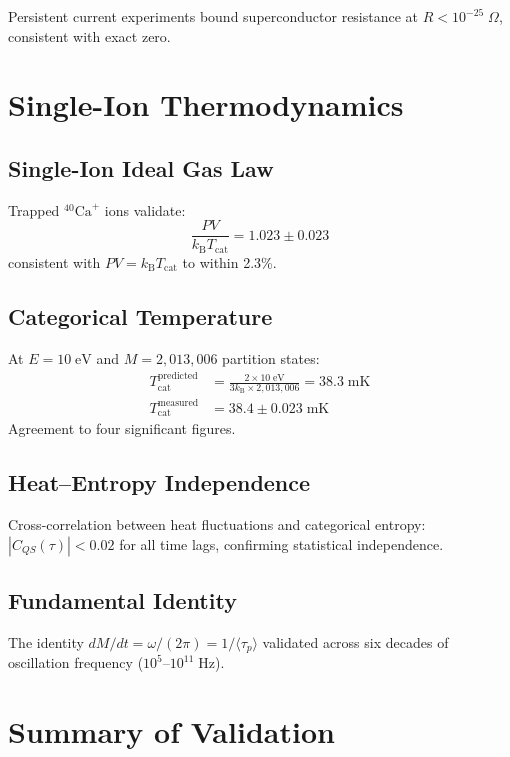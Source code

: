 \documentclass[twocolumn,10pt,a4paper]{article}
\theoremstyle{plain}
\theoremstyle{definition}
\theoremstyle{remark}
\newcommand{\kB}{k_{\mathrm{B}}}
\newcommand{\taup}{\tau_p}
\begin{document}
Persistent current experiments bound superconductor resistance at $R < 10^{-25}\;\Omega$, consistent with exact zero.

\section{Single-Ion Thermodynamics}
\label{sec:val_single}

\subsection{Single-Ion Ideal Gas Law}

Trapped $^{40}\mathrm{Ca}^+$ ions validate:
\begin{equation}
    \frac{PV}{\kB T_{\mathrm{cat}}} = 1.023 \pm 0.023
\end{equation}
consistent with $PV = \kB T_{\mathrm{cat}}$ to within 2.3\%.

\subsection{Categorical Temperature}

At $E = 10\;\mathrm{eV}$ and $M = 2{,}013{,}006$ partition states:
\begin{align}
    T_{\mathrm{cat}}^{\mathrm{predicted}} &= \frac{2 \times 10\;\mathrm{eV}}{3\kB \times 2{,}013{,}006} = 38.3\;\mathrm{mK} \\
    T_{\mathrm{cat}}^{\mathrm{measured}} &= 38.4 \pm 0.023\;\mathrm{mK}
\end{align}
Agreement to four significant figures.

\subsection{Heat--Entropy Independence}

Cross-correlation between heat fluctuations and categorical entropy: $|C_{QS}(\tau)| < 0.02$ for all time lags, confirming statistical independence.

\subsection{Fundamental Identity}

The identity $dM/dt = \omega/(2\pi) = 1/\langle\taup\rangle$ validated across six decades of oscillation frequency ($10^5$--$10^{11}\;\mathrm{Hz}$).

\section{Summary of Validation}
\label{sec:val_summary}
\end{document}
